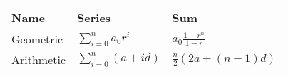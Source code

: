 \documentclass{article}
\begin{document}
\begin{table}[]
    \begin{tabular}{l|l|l}
        Name       & Series                   & Sum                           \\
        \hline
        Geometric  & $\sum_{i=0}^{n} a_0 r^i$ & $a_0 \frac{1 - r^n}{1 - r}$   \\
        \hline
        Arithmetic & $\sum_{i=0}^{n} (a+id)$  & $\frac{n}{2} (2a + (n - 1)d)$
    \end{tabular}
\end{table}
\end{document}
